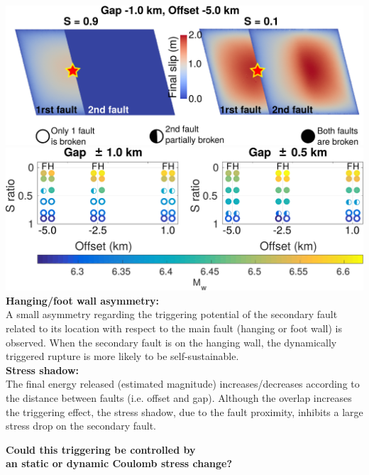 \vskip -0.15cm
 \includegraphics[width=1\linewidth]{images/ruptures.pdf}
 \vskip 0.1cm
 \includegraphics[width=1\linewidth]{images/results_table} \\
\vskip 0cm
\textbf{\small Hanging/foot wall asymmetry:} \\
\vskip -0.3cm
{\small A small asymmetry regarding the triggering potential of the secondary fault related to its location with respect to the main fault (hanging or foot wall) is observed. When the secondary fault is on the hanging wall, the dynamically triggered rupture is more likely to be self-sustainable.} \\
\vskip 0cm
\textbf{\small Stress shadow:} \\
\vskip -0.3cm
The final energy released (estimated magnitude) increases/decreases according to the distance between faults (i.e. offset and gap). Although the overlap increases the triggering effect, the stress shadow, due to the fault proximity, inhibits a large stress drop on the secondary fault.
\begin{center}
 \textbf{Could this triggering be controlled by \\ an static or dynamic Coulomb stress change?}
\end{center}
